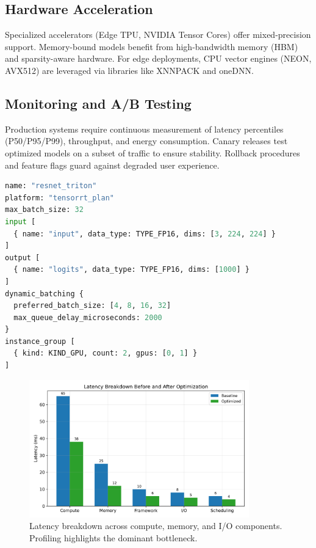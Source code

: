 \documentclass{article}
\begin{document}
\subsection{Hardware Acceleration}
Specialized accelerators (Edge TPU, NVIDIA Tensor Cores) offer mixed-precision support. Memory-bound models benefit from high-bandwidth memory (HBM) and sparsity-aware hardware. For edge deployments, CPU vector engines (NEON, AVX512) are leveraged via libraries like XNNPACK and oneDNN.

\subsection{Monitoring and A/B Testing}
Production systems require continuous measurement of latency percentiles (P50/P95/P99), throughput, and energy consumption. Canary releases test optimized models on a subset of traffic to ensure stability. Rollback procedures and feature flags guard against degraded user experience.

\begin{lstlisting}[language=Python, caption={Triton Inference Server dynamic batching configuration (YAML).}]
name: "resnet_triton"
platform: "tensorrt_plan"
max_batch_size: 32
input [
  { name: "input", data_type: TYPE_FP16, dims: [3, 224, 224] }
]
output [
  { name: "logits", data_type: TYPE_FP16, dims: [1000] }
]
dynamic_batching {
  preferred_batch_size: [4, 8, 16, 32]
  max_queue_delay_microseconds: 2000
}
instance_group [
  { kind: KIND_GPU, count: 2, gpus: [0, 1] }
]
\end{lstlisting}

\begin{figure}[H]
  \centering
  \includegraphics[width=0.85\textwidth]{latency_breakdown.png}
  \caption{Latency breakdown across compute, memory, and I/O components. Profiling highlights the dominant bottleneck.}
  \label{fig:latency_breakdown}
\end{figure}
\end{document}
